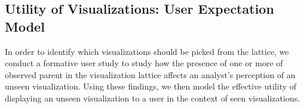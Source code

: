 \subsection{Utility of Visualizations: User Expectation Model\label{sec:utility}}
In order to identify which visualizations should be picked from the lattice, we conduct a formative user study
to study how the presence of one or more of observed parent in the visualization lattice affects an analyst's perception of an unseen visualization. Using these findings, we then model the effective utility of displaying an unseen visualization to a user in the context of seen visualizations.%


